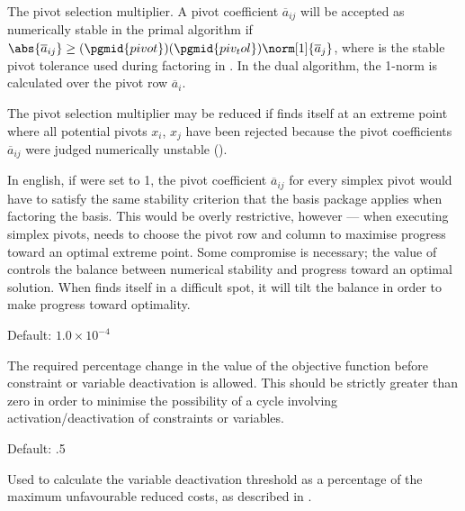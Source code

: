 \begin{codedoc}
  The pivot selection multiplier.
  A pivot coefficient $\overline{a}_{ij}$ will be accepted as
  numerically stable in the primal algorithm if
  $\abs{\overline{a}_{ij}} \ge
    (\pgmid{pivot})(\pgmid{piv_tol})\norm[1]{\overline{a}_j}$,
  where  is the stable pivot tolerance used during factoring
  in \glpk.
  In the dual algorithm, the 1-norm is calculated over the pivot row
  $\overline{a}_i$.

  The pivot selection multiplier may be reduced if \dylp finds itself at an
  extreme point where all potential pivots $x_i$, $x_j$ have been rejected
  because the pivot coefficients $\overline{a}_{ij}$ were judged numerically
  unstable (\vid {}).

  In english, if  were set to 1, the pivot coefficient
  $\overline{a}_{ij}$ for every simplex pivot would have to satisfy the same
  stability criterion that the \glpk basis package applies when factoring
  the basis.
  This would be overly restrictive, however --- when executing simplex pivots,
  \dylp needs to choose the pivot row and column to maximise progress toward
  an optimal extreme point.
  Some compromise is necessary; the value of  controls the
  balance between numerical stability and progress toward an optimal solution.
  When \dylp finds itself in a difficult spot, it will tilt the balance in
  order to make progress toward optimality.

  \item{}
    \kw{;}

  Default: $1.0 \times 10^{-4}$

  The required percentage change in the value of the objective function before
  constraint or variable deactivation is allowed.
  This should be strictly greater than zero in order to minimise the
  possibility of a cycle involving activation/deactivation of constraints or
  variables.

  \item{}
    \kw{;}

  Default: .5

  Used to calculate the variable deactivation threshold as a percentage of the
  maximum unfavourable reduced costs, as described in
  .

  \item{}
    \kw{;}


\end{codedoc}
